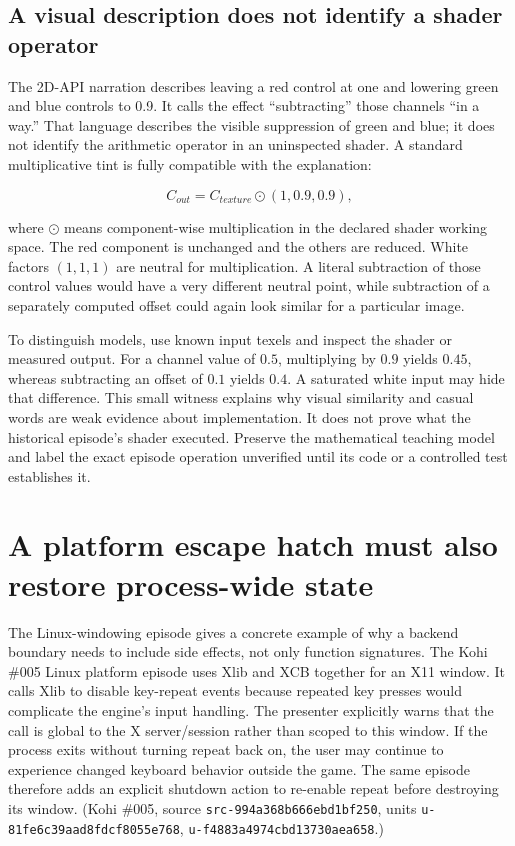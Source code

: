 \subsection{A visual description does not identify a shader operator}\label{05-engine-i-ch024-a-visual-description-does-not-identify-a-shader-operator}

The 2D-API narration describes leaving a red control at one and lowering green and blue controls to 0.9. It calls the effect ``subtracting'' those channels ``in a way.'' That language describes the visible suppression of green and blue; it does not identify the arithmetic operator in an uninspected shader. A standard multiplicative tint is fully compatible with the explanation:

\[
C_{out}=C_{texture}\odot(1,0.9,0.9),
\]

where \(\odot\) means component-wise multiplication in the declared shader working space. The red component is unchanged and the others are reduced. White factors \((1,1,1)\) are neutral for multiplication. A literal subtraction of those control values would have a very different neutral point, while subtraction of a separately computed offset could again look similar for a particular image.

To distinguish models, use known input texels and inspect the shader or measured output. For a channel value of \(0.5\), multiplying by \(0.9\) yields \(0.45\), whereas subtracting an offset of \(0.1\) yields \(0.4\). A saturated white input may hide that difference. This small witness explains why visual similarity and casual words are weak evidence about implementation. It does not prove what the historical episode's shader executed. Preserve the mathematical teaching model and label the exact episode operation unverified until its code or a controlled test establishes it.

\section{A platform escape hatch must also restore process-wide state}\label{05-engine-i-ch024-a-platform-escape-hatch-must-also-restore-process-wide-state}

The Linux-windowing episode gives a concrete example of why a backend boundary needs to include side effects, not only function signatures. The Kohi \#005 Linux platform episode uses Xlib and XCB together for an X11 window. It calls Xlib to disable key-repeat events because repeated key presses would complicate the engine's input handling. The presenter explicitly warns that the call is global to the X server/session rather than scoped to this window. If the process exits without turning repeat back on, the user may continue to experience changed keyboard behavior outside the game. The same episode therefore adds an explicit shutdown action to re-enable repeat before destroying its window. (Kohi \#005, source \texttt{src-994a368b666ebd1bf250}, units \texttt{u-81fe6c39aad8fdcf8055e768}, \texttt{u-f4883a4974cbd13730aea658}.)

